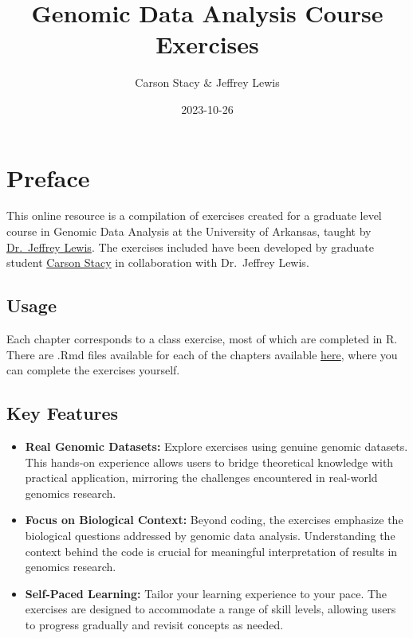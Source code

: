 \documentclass[
]{book}
\title{Genomic Data Analysis Course Exercises}
\author{Carson Stacy \& Jeffrey Lewis}
\date{2023-10-26}
\providecommand{\tightlist}{%
  \setlength{\itemsep}{0pt}\setlength{\parskip}{0pt}}
\begin{document}
\maketitle

{
\setcounter{tocdepth}{1}
\tableofcontents
}
\hypertarget{preface}{%
\chapter*{Preface}\label{preface}}

This online resource is a compilation of exercises created for a graduate level course in Genomic Data Analysis at the University of Arkansas, taught by \href{thelewislab.com}{Dr.~Jeffrey Lewis}. The exercises included have been developed by graduate student \href{clstacy.github.io}{Carson Stacy} in collaboration with Dr.~Jeffrey Lewis.

\hypertarget{usage}{%
\section{Usage}\label{usage}}

Each chapter corresponds to a class exercise, most of which are completed in R. There are .Rmd files available for each of the chapters available \href{https://github.com/clstacy/GenomicDataAnalysis_Fa23/tree/main/exercises}{here}, where you can complete the exercises yourself.

\hypertarget{key-features}{%
\section{\texorpdfstring{\textbf{Key Features}}{Key Features}}\label{key-features}}

\begin{itemize}
\item
  \textbf{Real Genomic Datasets:} Explore exercises using genuine genomic datasets. This hands-on experience allows users to bridge theoretical knowledge with practical application, mirroring the challenges encountered in real-world genomics research.
\item
  \textbf{Focus on Biological Context:} Beyond coding, the exercises emphasize the biological questions addressed by genomic data analysis. Understanding the context behind the code is crucial for meaningful interpretation of results in genomics research.
\end{itemize}

\begin{itemize}
\tightlist
\item
  \textbf{Self-Paced Learning:} Tailor your learning experience to your pace. The exercises are designed to accommodate a range of skill levels, allowing users to progress gradually and revisit concepts as needed.
\end{itemize}
\end{document}
